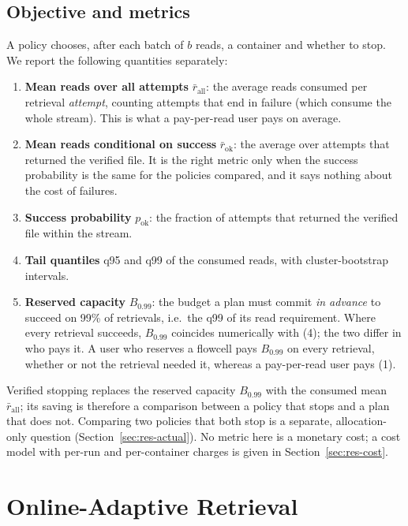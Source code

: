 \documentclass[acmsmall,screen]{acmart}
\begin{document}
\subsection{Objective and metrics}
A policy chooses, after each batch of $b$ reads, a container and whether to stop.  We report the
following quantities separately:
\begin{enumerate}
\item \textbf{Mean reads over all attempts} $\bar r_{\text{all}}$: the average reads consumed per
retrieval \emph{attempt}, counting attempts that end in failure (which consume the whole stream).
This is what a pay-per-read user pays on average.
\item \textbf{Mean reads conditional on success} $\bar r_{\text{ok}}$: the average over attempts that
returned the verified file.  It is the right metric only when the success probability is the same for
the policies compared, and it says nothing about the cost of failures.
\item \textbf{Success probability} $p_{\text{ok}}$: the fraction of attempts that returned the
verified file within the stream.
\item \textbf{Tail quantiles} q95 and q99 of the consumed reads, with cluster-bootstrap intervals.
\item \textbf{Reserved capacity} $B_{0.99}$: the budget a plan must commit \emph{in advance} to
succeed on 99\% of retrievals, i.e.\ the q99 of its read requirement.  Where every retrieval succeeds,
$B_{0.99}$ coincides numerically with (4); the two differ in who pays it.  A user who reserves a
flowcell pays $B_{0.99}$ on every retrieval, whether or not the retrieval needed it, whereas a
pay-per-read user pays (1).
\end{enumerate}
Verified stopping replaces the reserved capacity $B_{0.99}$ with the consumed mean $\bar r_{\text{all}}$;
its saving is therefore a comparison between a policy that stops and a plan that does not.  Comparing
two policies that both stop is a separate, allocation-only question (Section~\ref{sec:res-actual}).  No
metric here is a monetary cost; a cost model with per-run and per-container charges is given in
Section~\ref{sec:res-cost}.

\section{Online-Adaptive Retrieval}\label{sec:method}
\end{document}
